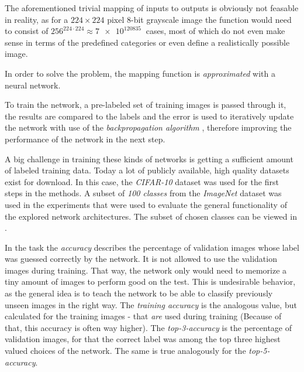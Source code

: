 The aforementioned trivial mapping of inputs to outputs is obviously not feasable in reality, as for a $224\times 224$ pixel 8-bit grayscale image the function would need to consist of $256^{224\cdot 224} \approx \SI[]{7e120835}[]{}$ cases, most of which do not even make sense in terms of the predefined categories or even define a realistically possible image.

In order to solve the problem, the mapping function is \emph{approximated} with a neural network. 

To train the network, a pre-labeled set of training images is passed through it, the results are compared to the labels and the error is used to iteratively update the network with use of the \emph{backpropagation algorithm} \cite{machineLearningMitchell}, therefore improving the performance of the network in the next step.

A big challenge in training these kinds of networks is getting a sufficient amount of labeled training data. 
Today a lot of publicly available, high quality datasets exist for download. 
In this case, the \emph{CIFAR-10} \cite{cifarDataset} dataset was used for the first steps in the methods. 
A subset of \emph{100 classes} from the \emph{ImageNet} \cite{imagenetDataset} dataset was used in the experiments that were used to evaluate the general functionality of the explored network architectures.
The subset of chosen classes can be viewed in .

In the task the \emph{accuracy} describes the percentage of validation images whose label was guessed correctly by the network. It is not allowed to use the validation images during training. That way, the network only would need to memorize a tiny amount of images to perform good on the test. This is undesirable behavior, as the general idea is to teach the network to be able to classify previously unseen images in the right way. The \emph{training accuracy} is the analogous value, but calculated for the training images - that \emph{are} used during training (Because of that, this accuracy is often way higher).
The \emph{top-3-accuracy} is the percentage of validation images, for that the correct label was among the top three highest valued choices of the network. The same is true analogously for the \emph{top-5-accuracy}.